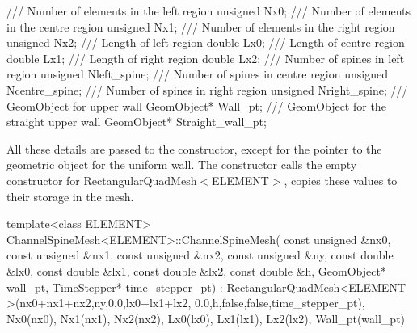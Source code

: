 \begin{DoxyCodeInclude}
 \textcolor{comment}{/// Number of elements in the left region}
 \textcolor{keywordtype}{unsigned} Nx0;
\textcolor{comment}{}
\textcolor{comment}{ /// Number of elements in the centre region}
\textcolor{comment}{} \textcolor{keywordtype}{unsigned} Nx1;
\textcolor{comment}{}
\textcolor{comment}{ /// Number of elements in the right region}
\textcolor{comment}{} \textcolor{keywordtype}{unsigned} Nx2;
\textcolor{comment}{}
\textcolor{comment}{ /// Length of left region}
\textcolor{comment}{} \textcolor{keywordtype}{double} Lx0;
\textcolor{comment}{}
\textcolor{comment}{ /// Length of centre region}
\textcolor{comment}{} \textcolor{keywordtype}{double} Lx1;
\textcolor{comment}{}
\textcolor{comment}{ /// Length of right region}
\textcolor{comment}{} \textcolor{keywordtype}{double} Lx2;
\textcolor{comment}{}
\textcolor{comment}{ /// Number of spines in left region}
\textcolor{comment}{} \textcolor{keywordtype}{unsigned} Nleft\_spine;
\textcolor{comment}{}
\textcolor{comment}{ /// Number of spines in centre region}
\textcolor{comment}{} \textcolor{keywordtype}{unsigned} Ncentre\_spine;
\textcolor{comment}{}
\textcolor{comment}{ /// Number of spines in right region}
\textcolor{comment}{} \textcolor{keywordtype}{unsigned} Nright\_spine;
\textcolor{comment}{}
\textcolor{comment}{ /// GeomObject for upper wall}
\textcolor{comment}{} GeomObject* Wall\_pt;
\textcolor{comment}{}
\textcolor{comment}{ /// GeomObject for the straight upper wall}
\textcolor{comment}{} GeomObject* Straight\_wall\_pt;

\end{DoxyCodeInclude}


All these details are passed to the constructor, except for the pointer to the geometric object for the uniform wall. The constructor calls the empty constructor for {\ttfamily Rectangular\+Quad\+Mesh$<$\+E\+L\+E\+M\+E\+N\+T$>$}, copies these values to their storage in the mesh.

 
\begin{DoxyCodeInclude}
\textcolor{keyword}{template}<\textcolor{keyword}{class} ELEMENT>
ChannelSpineMesh<ELEMENT>::ChannelSpineMesh(
 \textcolor{keyword}{const} \textcolor{keywordtype}{unsigned} &nx0,
 \textcolor{keyword}{const} \textcolor{keywordtype}{unsigned} &nx1,
 \textcolor{keyword}{const} \textcolor{keywordtype}{unsigned} &nx2,
 \textcolor{keyword}{const} \textcolor{keywordtype}{unsigned} &ny,
 \textcolor{keyword}{const} \textcolor{keywordtype}{double} &lx0,
 \textcolor{keyword}{const} \textcolor{keywordtype}{double} &lx1,
 \textcolor{keyword}{const} \textcolor{keywordtype}{double} &lx2,
 \textcolor{keyword}{const} \textcolor{keywordtype}{double} &h,
 GeomObject* wall\_pt, 
 TimeStepper* time\_stepper\_pt) :  
 RectangularQuadMesh<ELEMENT >(nx0+nx1+nx2,ny,0.0,lx0+lx1+lx2,
                               0.0,h,false,false,time\_stepper\_pt),
 Nx0(nx0), Nx1(nx1), Nx2(nx2), 
 Lx0(lx0), Lx1(lx1), Lx2(lx2), 
 Wall\_pt(wall\_pt)

\end{DoxyCodeInclude}



